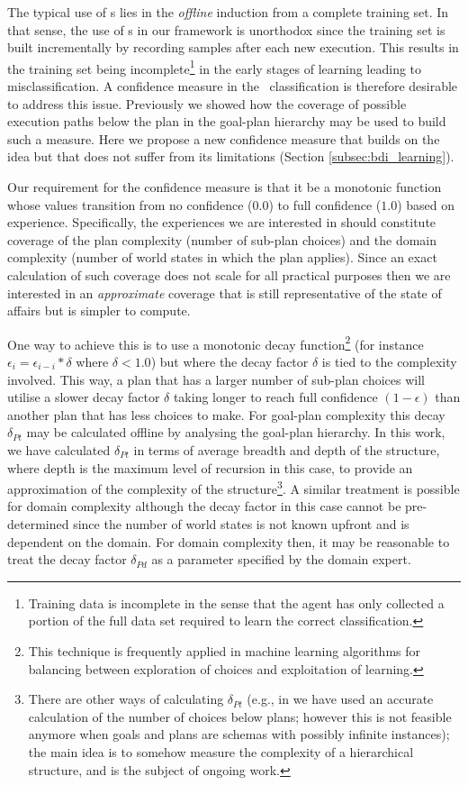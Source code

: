 The typical use of \dt s lies in the \textit{offline} induction from a complete
training set. In that sense, the use of \dt s in our framework is unorthodox
since the training set is built incrementally by recording samples after each new
execution. This results in the training set being incomplete\footnote{Training
data is incomplete in the sense that the agent has only collected a portion of
the full data set required to learn the correct classification.} in the early
stages of learning leading to misclassification. A confidence measure in the \dt\
classification is therefore desirable to address this issue. Previously
\cite{Singh:AAMAS10} we showed how the coverage of possible execution paths below
the plan in the goal-plan hierarchy may be used to build such a measure. Here we
propose a new confidence measure that builds on the idea but that does not suffer
from its limitations (Section \ref{subsec:bdi_learning}).

Our requirement for the confidence measure is that it be a monotonic function
whose values transition from no confidence ($0.0$) to full confidence ($1.0$)
based on experience. Specifically, the experiences we are interested in should
constitute coverage of the plan complexity (number of sub-plan choices) and the
domain complexity (number of world states in which the plan applies). Since an
exact calculation of such coverage does not scale for all practical purposes then
we are interested in an \textit{approximate} coverage that is still
representative of the state of affairs but is simpler to compute.

One way to achieve this is to use a monotonic decay function\footnote{This
technique is frequently applied in machine learning algorithms for balancing
between exploration of choices and exploitation of learning.} (for instance
$\epsilon_i = \epsilon_{i-i} * \delta$ where $\delta < 1.0$) but where the decay
factor $\delta$ is tied to the complexity involved. This way, a plan that has a
larger number of sub-plan choices will utilise a slower decay factor $\delta$
taking longer to reach full confidence $(1-\epsilon)$ than another plan that has
less choices to make. For goal-plan complexity this decay $\delta_{Pt}$ may be
calculated offline by analysing the goal-plan hierarchy. In this work, we have
calculated $\delta_{Pt}$ in terms of average breadth and depth of the structure,
where depth is the maximum level of recursion in this case, to provide an
approximation of the complexity of the structure\footnote{There are other ways of
calculating $\delta_{Pt}$ (e.g., in \cite{Singh:AAMAS10} we have used an accurate
calculation of the number of choices below plans; however this is not feasible
anymore when goals and plans are schemas with possibly infinite instances); the
main idea is to somehow measure the complexity of a hierarchical structure, and
is the subject of ongoing work.}. A similar treatment is possible for domain
complexity although the decay factor in this case cannot be pre-determined since
the number of world states is not known upfront and is dependent on the domain.
For domain complexity then, it may be reasonable to treat the decay factor
$\delta_{Pd}$ as a parameter specified by the domain expert.

